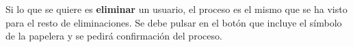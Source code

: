Si lo que se quiere es \textbf{eliminar} un usuario, el proceso es el mismo que
se ha visto para el resto de eliminaciones. Se debe pulsar en el botón que
incluye el símbolo de la papelera y se pedirá confirmación del proceso.

